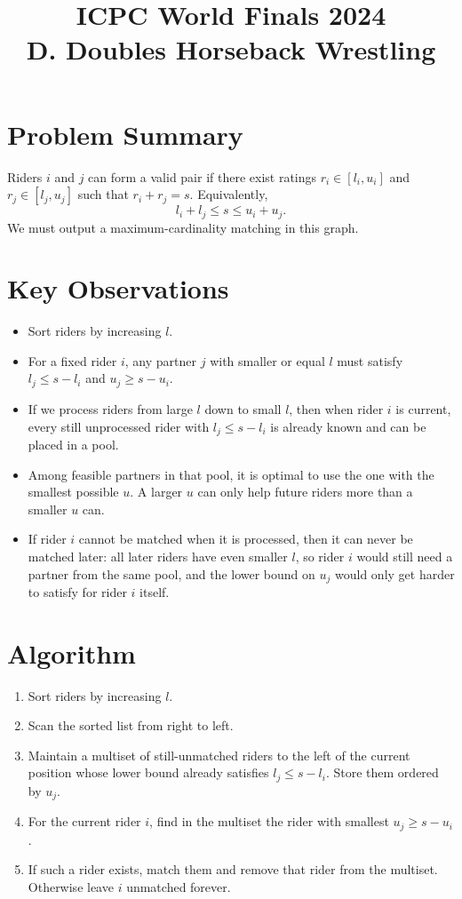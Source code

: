 \documentclass[11pt]{article}
\title{ICPC World Finals 2024\\D. Doubles Horseback Wrestling}
\author{}
\date{}
\begin{document}
\maketitle

\section*{Problem Summary}

Riders $i$ and $j$ can form a valid pair if there exist ratings
$r_i \in [l_i, u_i]$ and $r_j \in [l_j, u_j]$ such that $r_i + r_j = s$.
Equivalently,
\[
    l_i + l_j \le s \le u_i + u_j.
\]
We must output a maximum-cardinality matching in this graph.

\section*{Key Observations}

\begin{itemize}[leftmargin=*]
    \item Sort riders by increasing $l$.
    \item For a fixed rider $i$, any partner $j$ with smaller or equal $l$ must satisfy
    $l_j \le s - l_i$ and $u_j \ge s - u_i$.
    \item If we process riders from large $l$ down to small $l$, then when rider $i$ is current, every still
    unprocessed rider with $l_j \le s - l_i$ is already known and can be placed in a pool.
    \item Among feasible partners in that pool, it is optimal to use the one with the smallest possible $u$.
    A larger $u$ can only help future riders more than a smaller $u$ can.
    \item If rider $i$ cannot be matched when it is processed, then it can never be matched later: all later
    riders have even smaller $l$, so rider $i$ would still need a partner from the same pool, and the lower
    bound on $u_j$ would only get harder to satisfy for rider $i$ itself.
\end{itemize}

\section*{Algorithm}

\begin{enumerate}[leftmargin=*]
    \item Sort riders by increasing $l$.
    \item Scan the sorted list from right to left.
    \item Maintain a multiset of still-unmatched riders to the left of the current position whose lower bound
    already satisfies $l_j \le s - l_i$. Store them ordered by $u_j$.
    \item For the current rider $i$, find in the multiset the rider with smallest $u_j \ge s - u_i$.
    \item If such a rider exists, match them and remove that rider from the multiset. Otherwise leave $i$
    unmatched forever.
\end{enumerate}
\end{document}
